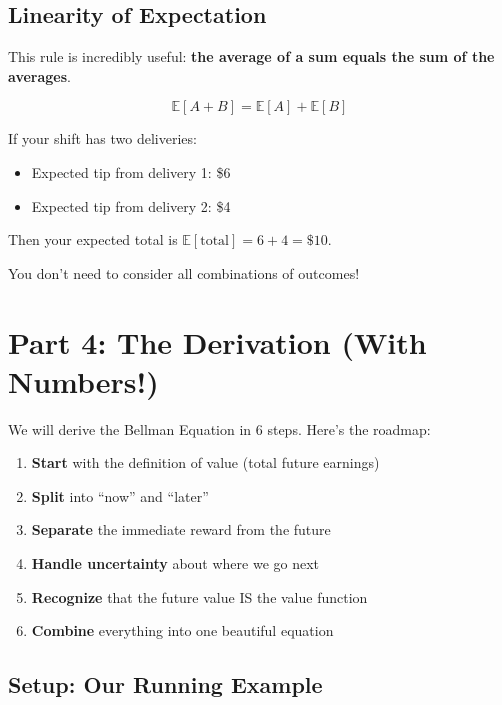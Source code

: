\documentclass[journal, onecolumn]{IEEEtran}
\begin{document}
\subsection{Linearity of Expectation}

This rule is incredibly useful: \textbf{the average of a sum equals the sum of the averages}.

\[ \mathbb{E}[A + B] = \mathbb{E}[A] + \mathbb{E}[B] \]

\begin{tcolorbox}[examplebox={Why This Matters}]
If your shift has two deliveries:
\begin{itemize}
    \item Expected tip from delivery 1: \$6
    \item Expected tip from delivery 2: \$4
\end{itemize}
Then your expected total is $\mathbb{E}[\text{total}] = 6 + 4 = \$10$.

You don't need to consider all combinations of outcomes!
\end{tcolorbox}

\newpage
\section{Part 4: The Derivation (With Numbers!)}

We will derive the Bellman Equation in 6 steps. Here's the roadmap:

\begin{tcolorbox}[memorybox={Derivation Roadmap}]
\begin{enumerate}[leftmargin=*, itemsep=0pt]
    \item \textbf{Start} with the definition of value (total future earnings)
    \item \textbf{Split} into ``now'' and ``later''
    \item \textbf{Separate} the immediate reward from the future
    \item \textbf{Handle uncertainty} about where we go next
    \item \textbf{Recognize} that the future value IS the value function
    \item \textbf{Combine} everything into one beautiful equation
\end{enumerate}
\end{tcolorbox}

\subsection{Setup: Our Running Example}
\end{document}
